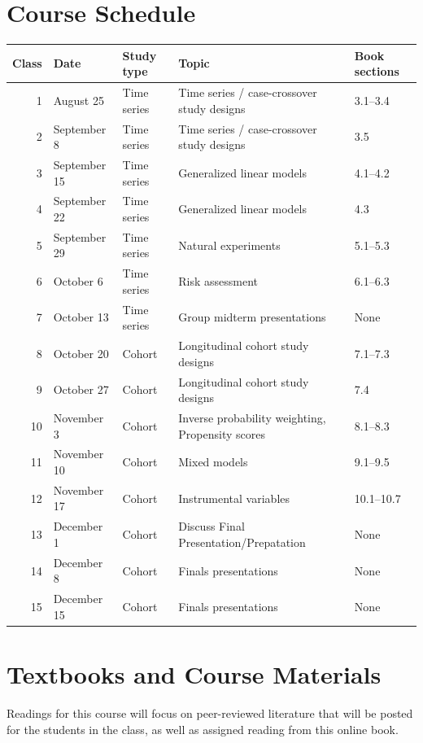 \documentclass[
]{book}
\begin{document}
\section{Course Schedule}\label{course-schedule}

\begin{tabular}{r|l|l|l|l}
\hline
Class & Date & Study type & Topic & Book sections\\
\hline
1 & August 25 & Time series & Time series / case-crossover study designs & 3.1--3.4\\
\hline
2 & September 8 & Time series & Time series / case-crossover study designs & 3.5\\
\hline
3 & September 15 & Time series & Generalized linear models & 4.1--4.2\\
\hline
4 & September 22 & Time series & Generalized linear models & 4.3\\
\hline
5 & September 29 & Time series & Natural experiments & 5.1--5.3\\
\hline
6 & October 6 & Time series & Risk assessment & 6.1--6.3\\
\hline
7 & October 13 & Time series & Group midterm presentations & None\\
\hline
8 & October 20 & Cohort & Longitudinal cohort study designs & 7.1--7.3\\
\hline
9 & October 27 & Cohort & Longitudinal cohort study designs & 7.4\\
\hline
10 & November 3 & Cohort & Inverse probability weighting, Propensity scores & 8.1--8.3\\
\hline
11 & November 10 & Cohort & Mixed models & 9.1--9.5\\
\hline
12 & November 17 & Cohort & Instrumental variables & 10.1--10.7\\
\hline
13 & December 1 & Cohort & Discuss Final Presentation/Prepatation & None\\
\hline
14 & December 8 & Cohort & Finals presentations & None\\
\hline
15 & December 15 & Cohort & Finals presentations & None\\
\hline
\end{tabular}

\section{Textbooks and Course Materials}\label{textbooks-and-course-materials}

Readings for this course will focus on peer-reviewed literature that will be
posted for the students in the class, as well as assigned reading from this
online book.
\end{document}
